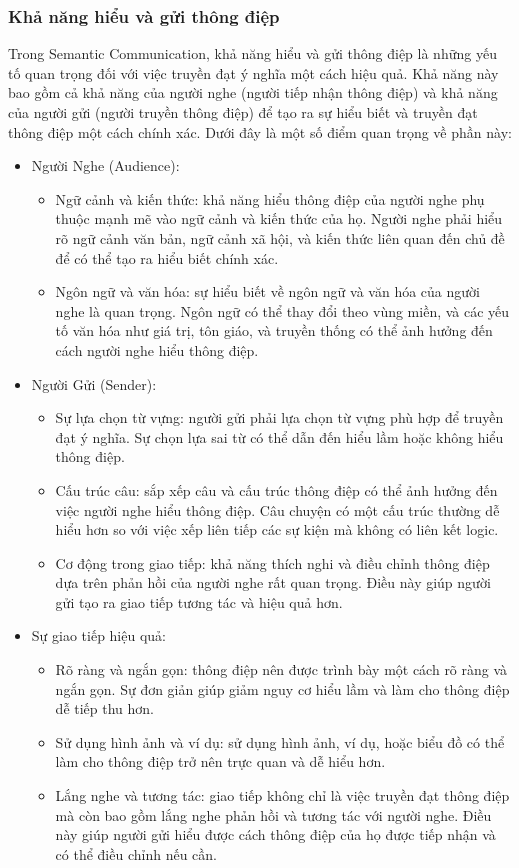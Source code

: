 \documentclass{article} %
\begin{document}
\subsubsection{Khả năng hiểu và gửi thông điệp}

Trong Semantic Communication, khả năng hiểu và gửi thông điệp là những yếu tố quan trọng đối với việc truyền đạt ý nghĩa một cách hiệu quả. Khả năng này bao gồm cả khả năng của người nghe (người tiếp nhận thông điệp) và khả năng của người gửi (người truyền thông điệp) để tạo ra sự hiểu biết và truyền đạt thông điệp một cách chính xác. Dưới đây là một số điểm quan trọng về phần này:
\begin{itemize}
\item Người Nghe (Audience):
\begin{itemize}
    \item Ngữ cảnh và kiến thức: khả năng hiểu thông điệp của người nghe phụ thuộc mạnh mẽ vào ngữ cảnh và kiến thức của họ. Người nghe phải hiểu rõ ngữ cảnh văn bản, ngữ cảnh xã hội, và kiến thức liên quan đến chủ đề để có thể tạo ra hiểu biết chính xác.
\item Ngôn ngữ và văn hóa: sự hiểu biết về ngôn ngữ và văn hóa của người nghe là quan trọng. Ngôn ngữ có thể thay đổi theo vùng miền, và các yếu tố văn hóa như giá trị, tôn giáo, và truyền thống có thể ảnh hưởng đến cách người nghe hiểu thông điệp.
\end{itemize}

\item Người Gửi (Sender):
\begin{itemize}
    
\item Sự lựa chọn từ vựng: người gửi phải lựa chọn từ vựng phù hợp để truyền đạt ý nghĩa. Sự chọn lựa sai từ có thể dẫn đến hiểu lầm hoặc không hiểu thông điệp.
\item Cấu trúc câu: sắp xếp câu và cấu trúc thông điệp có thể ảnh hưởng đến việc người nghe hiểu thông điệp. Câu chuyện có một cấu trúc thường dễ hiểu hơn so với việc xếp liên tiếp các sự kiện mà không có liên kết logic.
\item Cơ động trong giao tiếp: khả năng thích nghi và điều chỉnh thông điệp dựa trên phản hồi của người nghe rất quan trọng. Điều này giúp người gửi tạo ra giao tiếp tương tác và hiệu quả hơn.
\end{itemize}

\item Sự giao tiếp hiệu quả:
\begin{itemize}
    \item Rõ ràng và ngắn gọn: thông điệp nên được trình bày một cách rõ ràng và ngắn gọn. Sự đơn giản giúp giảm nguy cơ hiểu lầm và làm cho thông điệp dễ tiếp thu hơn.
\item Sử dụng hình ảnh và ví dụ: sử dụng hình ảnh, ví dụ, hoặc biểu đồ có thể làm cho thông điệp trở nên trực quan và dễ hiểu hơn.
\item Lắng nghe và tương tác: giao tiếp không chỉ là việc truyền đạt thông điệp mà còn bao gồm lắng nghe phản hồi và tương tác với người nghe. Điều này giúp người gửi hiểu được cách thông điệp của họ được tiếp nhận và có thể điều chỉnh nếu cần.
\end{itemize}


\end{itemize}
\end{document}
